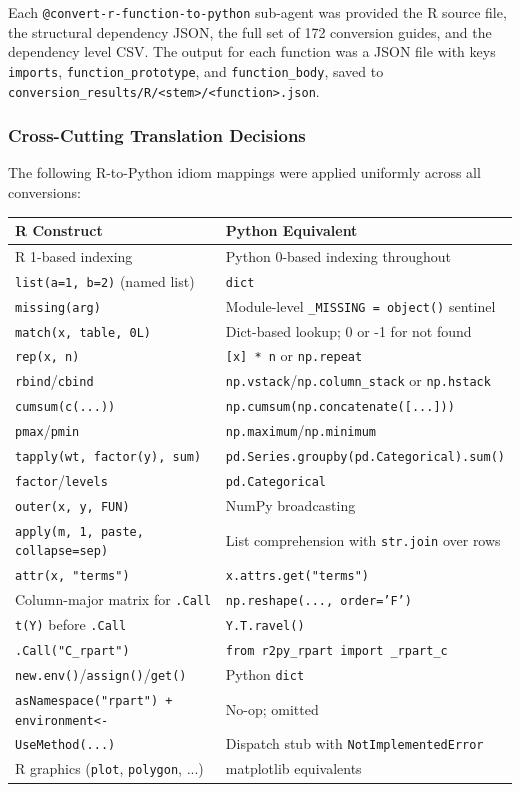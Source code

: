 \documentclass[12pt]{article}
\begin{document}
Each \texttt{@convert-r-function-to-python} sub-agent was provided the R source file, the structural dependency JSON, the full set of 172 conversion guides, and the dependency level CSV. The output for each function was a JSON file with keys \texttt{imports}, \texttt{function\_prototype}, and \texttt{function\_body}, saved to \texttt{conversion\_results/R/<stem>/<function>.json}.

\subsubsection{Cross-Cutting Translation Decisions}

The following R-to-Python idiom mappings were applied uniformly across all conversions:
\begin{center}
\begin{tabular}{ll}
\toprule
R Construct & Python Equivalent \\
\midrule
R 1-based indexing & Python 0-based indexing throughout \\
\texttt{list(a=1, b=2)} (named list) & \texttt{dict} \\
\texttt{missing(arg)} & Module-level \texttt{\_MISSING = object()} sentinel \\
\texttt{match(x, table, 0L)} & Dict-based lookup; 0 or -1 for not found \\
\texttt{rep(x, n)} & \texttt{[x] * n} or \texttt{np.repeat} \\
\texttt{rbind}/\texttt{cbind} & \texttt{np.vstack}/\texttt{np.column\_stack} or \texttt{np.hstack} \\
\texttt{cumsum(c(...))} & \texttt{np.cumsum(np.concatenate([...]))} \\
\texttt{pmax}/\texttt{pmin} & \texttt{np.maximum}/\texttt{np.minimum} \\
\texttt{tapply(wt, factor(y), sum)} & \texttt{pd.Series.groupby(pd.Categorical).sum()} \\
\texttt{factor}/\texttt{levels} & \texttt{pd.Categorical} \\
\texttt{outer(x, y, FUN)} & NumPy broadcasting \\
\texttt{apply(m, 1, paste, collapse=sep)} & List comprehension with \texttt{str.join} over rows \\
\texttt{attr(x, "terms")} & \texttt{x.attrs.get("terms")} \\
Column-major matrix for \texttt{.Call} & \texttt{np.reshape(..., order='F')} \\
\texttt{t(Y)} before \texttt{.Call} & \texttt{Y.T.ravel()} \\
\texttt{.Call("C\_rpart")} & \texttt{from r2py\_rpart import \_rpart\_c} \\
\texttt{new.env()}/\texttt{assign()}/\texttt{get()} & Python \texttt{dict} \\
\texttt{asNamespace("rpart") + environment<-} & No-op; omitted \\
\texttt{UseMethod(...)} & Dispatch stub with \texttt{NotImplementedError} \\
R graphics (\texttt{plot}, \texttt{polygon}, ...) & matplotlib equivalents \\
\bottomrule
\end{tabular}
\end{center}
\end{document}
